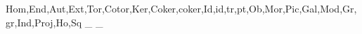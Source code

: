 \NewDocumentCommand \Aff {} {} %
\NewDocumentCommand \Vect {} {} %
\createbunch{\ensuremath\fun}
	{Hom,End,Aut,Ext,Tor,Cotor,Ker,Coker,coker,Id,id,tr,pt,Ob,Mor,Pic,Gal,Mod,Gr,gr,Ind,Proj,Ho,Sq} %
\NewDocumentCommand \zero {} 
	{} %
\NewDocumentCommand \one {} 
	{} %
\NewDocumentCommand \vac {} 
	{} %
\NewDocumentCommand \Gm {} 
	{_{}} %
\NewDocumentCommand \Ga {} 
	{_{}} %
\NewDocumentCommand \Dedekind {} 
	{} %
\NewDocumentCommand \dedekind {} 
	{{\scriptstyle\Dedekind}} %
\NewDocumentCommand \Osheaf {} 
	{} %
\NewDocumentCommand \bigO {} 
	{} %
\NewDocumentCommand{}
% 
